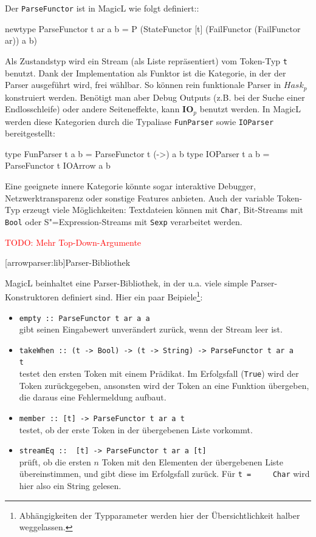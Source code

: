 \documentclass[12pt, a4paper, bibgerm]{scrbook}
\newenvironment{DIFnomarkup}{}{}
\newcommand\icode[1]{\lstinline?#1?}
\newcommand{\todo}[1]{
  \textcolor{red}{TODO: #1}
}
\newcommand\lsection{}
\newcommand{\sexp}{S"=Expression}
\begin{document}
Der \icode{ParseFunctor} ist in MagicL wie folgt definiert::
\begin{DIFnomarkup}\begin{code}
newtype ParseFunctor t ar a b =
  P (StateFunctor
     [t]
     (FailFunctor (FailFunctor ar))
     a
     b)
\end{code}\end{DIFnomarkup}
Als Zustandstyp wird ein Stream (als Liste repräsentiert) vom Token-Typ
\icode{t} benutzt.  Dank der Implementation als Funktor ist die
Kategorie, in der der Parser ausgeführt wird, frei wählbar. So können
rein funktionale Parser in $Hask_p$ konstruiert werden. Benötigt man
aber Debug Outputs (z.B. bei der Suche einer Endlosschleife) oder andere
Seiteneffekte, kann $\mathbf{IO}_p$ benutzt werden. In MagicL werden
diese Kategorien durch die Typaliase \icode{FunParser} sowie
\icode{IOParser} bereitgestellt:
\begin{DIFnomarkup}\begin{code}
type FunParser t a b = ParseFunctor t (->) a b
type IOParser  t a b = ParseFunctor t IOArrow a b
\end{code}\end{DIFnomarkup}
Eine geeignete innere Kategorie könnte
sogar interaktive Debugger, Netzwerktransparenz oder sonstige Features
anbieten. Auch der variable Token-Typ erzeugt viele Möglichkeiten:
Textdateien können mit \icode{Char}, Bit-Streams mit \icode{Bool} oder
\sexp{}-Streams mit \icode{Sexp} verarbeitet werden.

\todo{Mehr Top-Down-Argumente}

\lsection[arrowparser:lib]{Parser-Bibliothek}

MagicL beinhaltet eine Parser-Bibliothek, in der u.a. viele simple
Parser-Konstruktoren definiert sind. Hier ein paar
Beipiele\footnote{Abhängigkeiten der Typparameter werden hier der
  Übersichtlichkeit halber weggelassen.}:
\begin{itemize}
\item \icode{empty :: ParseFunctor t ar a a}\\
  gibt seinen Eingabewert unverändert zurück, wenn der Stream leer ist.
\item \icode{takeWhen :: (t -> Bool) -> (t -> String) -> ParseFunctor t ar a
    t}\\
  testet den ersten Token mit einem Prädikat. Im Erfolgsfall (\icode{True}) wird der
  Token zurückgegeben, ansonsten wird der Token an eine Funktion
  übergeben, die daraus eine Fehlermeldung aufbaut.
\item \icode{member :: [t] -> ParseFunctor t ar a t}\\
  testet, ob der erste Token in der übergebenen Liste vorkommt.
\item \icode{streamEq ::  [t] -> ParseFunctor t ar a [t]}\\
  prüft, ob die ersten $n$ Token mit den Elementen der übergebenen Liste
  übereinstimmen, und gibt diese im Erfolgsfall zurück. Für \icode{t =
    Char} wird hier also ein String gelesen.
\end{itemize}
\end{document}
